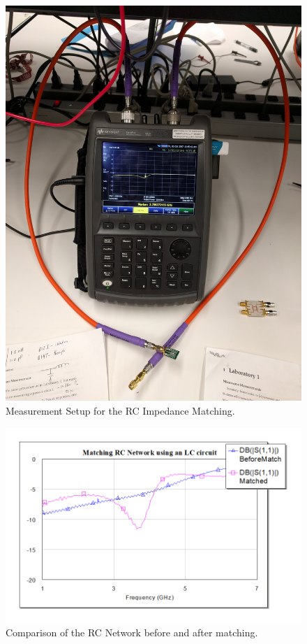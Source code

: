 \documentclass[twocolumn, aps, apl]{revtex4-1}
\begin{document}
\begin{figure}[!htbp]
    \centering
    \includegraphics[scale=0.05]{RCImg.jpg}
    \caption{Measurement Setup for the RC Impedance Matching.}
    \label{fig:RCimg}
\end{figure}

\begin{figure}[!htbp]
    \centering
    \includegraphics[scale=0.4]{RCMatched.png}
    \caption{Comparison of the RC Network before and after matching.}
    \label{fig:RCmatched}
\end{figure}
\end{document}
